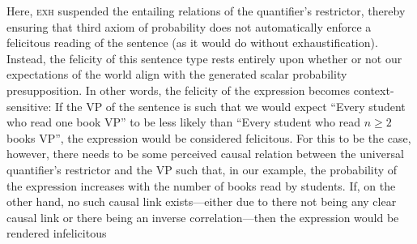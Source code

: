 \xe
Here, {\scshape exh} suspended the entailing relations of the quantifier's restrictor, thereby ensuring that  third axiom of probability does not automatically enforce a felicitous reading of the sentence (as it would do without exhaustification). Instead, the felicity of this sentence type rests entirely upon whether or not our expectations of the world align with the generated scalar probability presupposition. In other words, the felicity of the expression becomes context-sensitive: If the VP of the sentence is such that we would expect \enquote{Every student who read one book VP} to be less likely than \enquote{Every student who read $n\geqslant2$ books VP}, the expression would be considered felicitous. For this to be the case, however, there needs to be some perceived causal relation between the universal quantifier's restrictor and the VP such that, in our example, the probability of the expression increases with the number of books read by students. If, on the other hand, no such causal link exists---either due to there not being any clear causal link or there being an inverse correlation---then the expression would be rendered infelicitous \parencite[p.~136]{Crnic2014-dogma}

